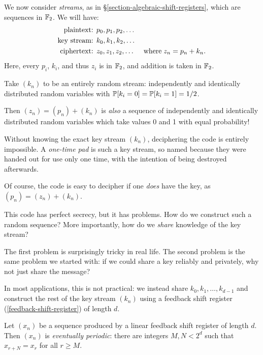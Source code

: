 \documentclass{article}
\begin{document}
We now consider \textit{streams}, as in \S\ref{section-algebraic-shift-registers}, which are sequences in $\F_2$. We will have:
\begin{align*}
    \text{plaintext: } &p_0, p_1, p_2, \dots \\
    \text{key stream: } &k_0, k_1, k_2, \dots \\
    \text{ciphertext: } &z_0, z_1, z_2, \dots \quad \where z_n = p_n + k_n.
\end{align*}
Here, every $p_i$, $k_i$, and thus $z_i$ is in $\F_2$, and addition is taken in $\F_2$.

\begin{definition}
	\label{one-time-pad}
    Take $(k_n)$ to be an entirely random stream: independently and identically distributed random variables with $\P[k_i = 0] = \P[k_i = 1] = 1/2$.
    
    Then $(z_n) = (p_n) + (k_n)$ is \textit{also} a sequence of independently and identically distributed random variables which take values 0 and 1 with equal probability!
    
    Without knowing the exact key stream $(k_n)$, deciphering the code is entirely impossible. A  \textit{one-time pad} is such a key stream, so named because they were handed out for use only one time, with the intention of being destroyed afterwards.
    
    Of course, the code is easy to decipher if one \textit{does} have the key, as $(p_n) = (z_n) + (k_n)$.
\end{definition}

This code has perfect secrecy, but it has problems. How do we construct such a random sequence? More importantly, how do we \textit{share} knowledge of the key stream?

The first problem is surprisingly tricky in real life. The second problem is the same problem we started with: if we could share a key reliably and privately, why not just share the message?

In most applications, this is not practical: we instead share $k_0, k_1, \dots, k_{d-1}$ and construct the rest of the key stream $(k_n)$ using a feedback shift register (\ref{feedback-shift-register}) of length $d$.

\begin{proposition}
    Let $(x_n)$ be a sequence produced by a linear feedback shift register of length $d$. Then $(x_n)$ is \textit{eventually periodic}: there are integers $M, N < 2^d$ such that $x_{r+N} = x_r$ for all $r \geq M$.
\end{proposition}
\end{document}
